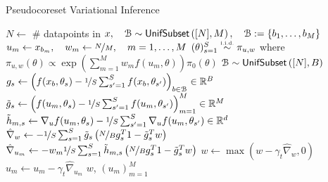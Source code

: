 \begin{algorithm}[!t]
	\caption{Pseudocoreset Variational Inference}
	\label{alg:psvi}
	\begin{algorithmic}[1]
		\State $N \gets $ \# datapoints in $x, \quad \mathcal{B}\sim{\sf{UnifSubset}}\left([N], M\right), \quad \mathcal{B} := \left\{b_1, \dots, b_M\right\}$ 
		\State $u_m \gets x_{b_m}, \quad w_m \gets \nicefrac{N}{M}, \quad m=1, \dots, M$
		\State $(\theta)_{s=1}^{S}  \distiid \pi_{u,w}$ where $\pi_{u,w}(\theta) \propto \exp\left(\sum_{m=1}^Mw_m f(u_m, \theta)\right)\pi_0(\theta)$
		\State $\mathcal{B}\sim{\sf{UnifSubset}}\left([N], B\right)$ 
		 	
		\State $g_{s} \gets \left( f(x_b, \theta_s ) - \nicefrac{1}{S}\sum_{s'=1}^S f(x_b, \theta_{s'}) \right)_{b\in\mathcal{B}} \in \mathbb{R}^B$ 
		\State $\tilde{g}_s\gets \left(f(u_m, \theta_s) - \nicefrac{1}{S}\sum_{s'=1}^S f(u_m, \theta_{s'})\right)_{m=1}^M\in\mathbb{R}^M$
		\State $\tilde{h}_{m,s} \gets \nabla_u f(u_m, \theta_s) - \nicefrac{1}{S}\sum_{s'=1}^S \nabla_u f(u_m, \theta_{s'})\in\mathbb{R}^d$
		\EndFor
		\EndFor
		\State $\hat\nabla_w \gets -\nicefrac{1}{S}\sum_{s=1}^S \tilde{g}_s\left(\nicefrac{N}{B} g_s^T1 - \tilde{g}_s^Tw\right)$
		\State $\hat\nabla_{u_m} \gets -w_m\nicefrac{1}{S}\sum_{s=1}^S \tilde{h}_{m,s}\left(\nicefrac{N}{B} g_s^T1 - \tilde{g}_s^Tw\right)$
		\EndFor
		\State $w \gets \max(w - \gamma_t\hat\nabla_w, 0)$ 
		 
		\State $u_m \gets u_m - \gamma_t\hat\nabla_{u_m}$
		\EndFor
		\EndFor
		\State\Return $w$, $(u_m)_{m=1}^M$
		\EndProcedure		 
	\end{algorithmic}
\end{algorithm}


